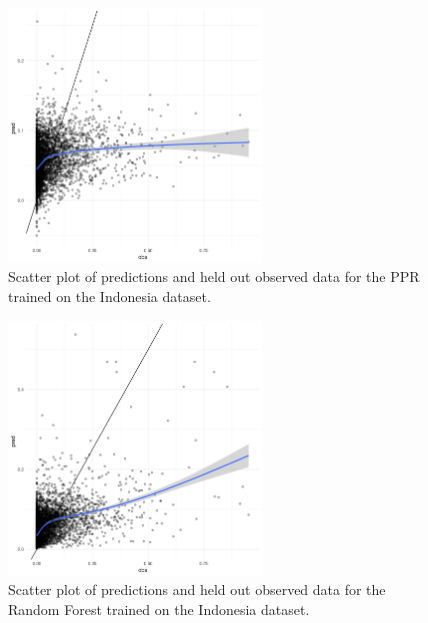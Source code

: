 \documentclass[review]{elsarticle}
\begin{document}
\begin{figure}[h!]
  \centering
  \includegraphics[width=0.6\textwidth]{figs/SI/ppr_obspred_idn.png}
\caption{
  Scatter plot of predictions and held out observed data for the PPR trained on the Indonesia dataset.
}

\end{figure}


\begin{figure}[h!]
  \centering
  \includegraphics[width=0.6\textwidth]{figs/SI/ranger_obspred_idn.png}
\caption{
  Scatter plot of predictions and held out observed data for the Random Forest trained on the Indonesia dataset.
}

\end{figure}
\end{document}
